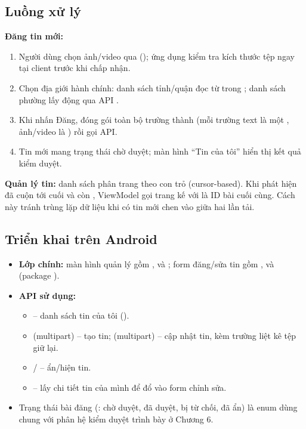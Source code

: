\subsection{Luồng xử lý}
\textbf{Đăng tin mới:}
\begin{enumerate}
    \item Người dùng chọn ảnh/video qua 
    (); ứng dụng kiểm tra kích thước tệp ngay tại client
    trước khi chấp nhận.
    \item Chọn địa giới hành chính: danh sách tỉnh/quận đọc từ
     trong ; danh sách phường lấy động qua
    API .
    \item Khi nhấn Đăng,  đóng gói toàn bộ trường
    thành  (mỗi trường text là một
    , ảnh/video là ) rồi gọi API.
    \item Tin mới mang trạng thái chờ duyệt; màn hình ``Tin của tôi'' hiển thị
    kết quả kiểm duyệt.
\end{enumerate}
\textbf{Quản lý tin:} danh sách phân trang theo con trỏ (cursor-based). Khi
 phát hiện đã cuộn tới cuối và  còn
, ViewModel gọi trang kế với  là ID bài cuối cùng.
Cách này tránh trùng lặp dữ liệu khi có tin mới chen vào giữa hai lần tải.

\subsection{Triển khai trên Android}
\begin{itemize}
    \item \textbf{Lớp chính:} màn hình quản lý gồm ,
     và ; form đăng/sửa tin gồm
    ,  và
     (package ).
    \item \textbf{API sử dụng:}
    \begin{itemize}
        \item {} -- danh sách tin
        của tôi ().
        \item {} (multipart) -- tạo tin;
         (multipart) -- cập nhật tin, kèm
        trường  liệt kê tệp giữ lại.
        \item {} /  --
        ẩn/hiện tin.
        \item {} -- lấy chi tiết tin của mình
        để đổ vào form chỉnh sửa.
    \end{itemize}
    \item Trạng thái bài đăng (: chờ duyệt, đã duyệt, bị từ
    chối, đã ẩn) là enum dùng chung với phân hệ kiểm duyệt trình bày ở
    Chương 6.
\end{itemize}

